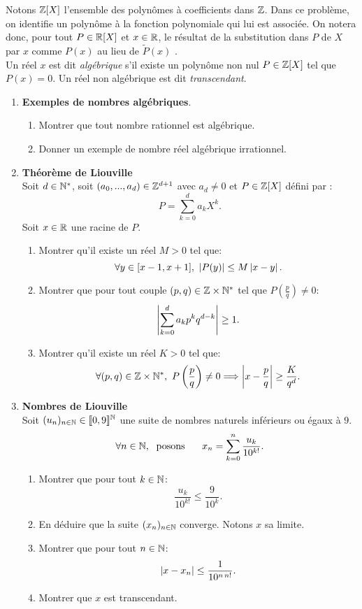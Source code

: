 Notons $\mathbb{Z}[X]$ l'ensemble des polynômes à coefficients dans $\mathbb{Z}$. Dans ce problème, on identifie un polynôme à la fonction polynomiale qui lui est associée. On notera donc, pour tout $P\in \mathbb{R}[X]$ et $x\in \mathbb{R}$, le résultat de la substitution dans $P$ de $X$ par $x$ comme $P(x)$ au lieu de $\widetilde{P}(x)$ . \\
Un réel $x$ est dit \emph{algébrique} s'il existe un polynôme non nul $P\in \mathbb{Z}[X]$ tel que $P(x) = 0$. Un réel non algébrique est dit \emph{transcendant}. 

\begin{enumerate}

\item {\bf Exemples de nombres algébriques}.
 \begin{enumerate}
    \item Montrer que tout nombre rationnel est algébrique.
    \item Donner un exemple de nombre réel algébrique irrationnel.
 \end{enumerate}

\item {\bf Théorème de Liouville}\\
Soit $d\in \mathbb{N}^{*}$, soit $(a_{0},...,a_{d})\in \mathbb{Z}^{d+1}$ avec $a_d\neq 0$ et $P\in \mathbb{Z}[X]$ défini par :
\[
 P = \sum_{k=0}^{d}a_{k}X^{k}.
\]
Soit $x\in \mathbb{R}$ une racine de $P$.
\begin{enumerate}
 \item Montrer qu'il existe un réel $M>0$ tel que: 
 $$\forall y\in [x-1,x+1],\ \abs{P(y)}\leq M\abs{x-y}.$$ 
 \item Montrer que pour tout couple $(p,q)\in \mathbb{Z}\times \mathbb{N}^{*}$ tel que $\displaystyle{P\left ( \frac{p}{q} \right ) \neq 0}$:
 $$\left\vert\sum_{k=0}^{d}a_{k}p^{k}q^{d-k}\right\vert\geq 1.$$
 \item Montrer qu'il existe un réel $K>0$ tel que:
 $$\forall (p,q)\in \Z\times \N^{*},\ P\left (\frac{p}{q} \right ) \neq 0 \Longrightarrow \abs{x - \frac{p}{q}} \geq \frac{K}{q^{d}}.$$
\end{enumerate}

\item {\bf Nombres de Liouville}\\
Soit $(u_{n})_{n \in \mathbb{N}}\in \llbracket 0, 9\rrbracket^{\mathbb{N}}$ une suite de nombres naturels inférieurs ou égaux à $9$.
\[
\forall n \in \mathbb{N}, \; \text{ posons }\hspace{0.5cm} x_{n} = \sum_{k=0}^{n}\frac{u_{k}}{10^{k!}}.
\]
\begin{enumerate}
 \item Montrer que pour tout $k\in \mathbb{N}$:
 $$\frac{u_{k}}{10^{k!}} \leq \frac{9}{10^{k}}.$$
 \item En déduire que la suite $(x_{n})_{n\in \mathbb{N}}$ converge. Notons $x$ sa limite. 
 \item Montrer que pour tout $n\in \mathbb{N}$:
\[
\left\vert x-x_{n}\right\vert\leq \frac{1}{10^{n\,n!}}. 
\]

 \item Montrer que $x$ est transcendant.
\end{enumerate}

\end{enumerate}


